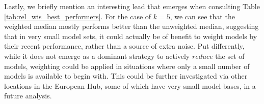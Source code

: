 Lastly, we briefly mention an interesting lead that emerges when consulting Table \ref{tab:rel_wis_best_performers}. For the case of $k = 5$, we can see that the weighted median mostly performs better than the unweighted median, suggesting that in very small model sets, it could actually be of benefit to weight models by their recent performance, rather than a source of extra noise. Put differently, while it does not emerge as a dominant strategy to actively $reduce$ the set of models, weighting could be applied in situations where only a small number of models is available to begin with. This could be further investigated via other locations in the European Hub, some of which have very small model bases, in a future analysis. \medskip\\
